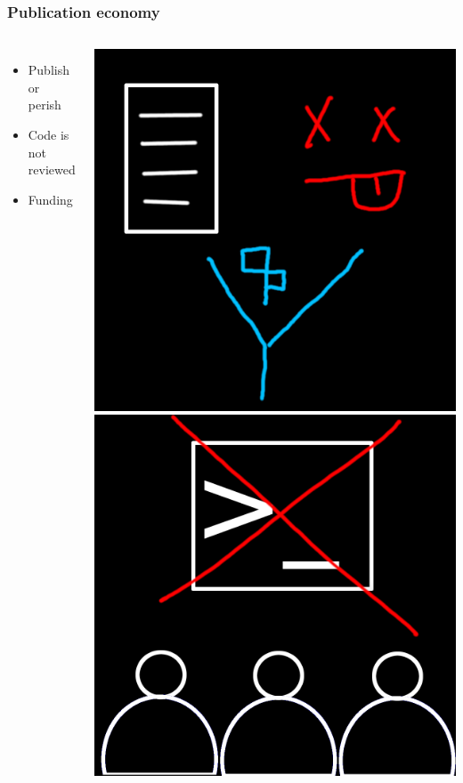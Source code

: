 \documentclass{beamer}
\begin{document}
\begin{frame}
\frametitle{Publication economy}

\begin{columns}
\begin{itemize}
\item Publish or perish
\item Code is not reviewed
\item Funding
\end{itemize}

\begin{columns}
\includegraphics[width=\textwidth]{PP.png}
\includegraphics[width=\textwidth]{review.png}

\end{columns}
\end{columns}
\end{frame}
\end{document}

